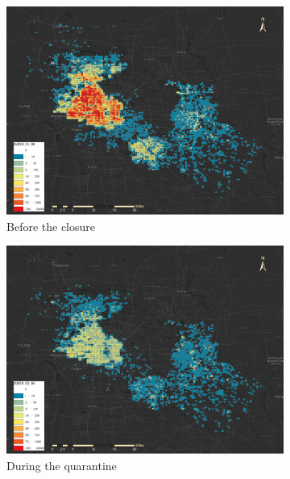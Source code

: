\documentclass[preprints,ijgi,submit,moreauthors]{Definitions/mdpi}
\begin{document}
\begin{figure}[H]
    \begin{subfigure}{.3\textwidth}
        \includegraphics[width=\textwidth]{Definitions/D2020_01_09.png}
        \caption{Before the closure}
    \end{subfigure}
    \begin{subfigure}{.3\textwidth}
        \includegraphics[width=\textwidth]{Definitions/D2020_02_05.png}
        \caption{During the quarantine}
    \end{subfigure}
    \begin{subfigure}{.3\textwidth}

\end{subfigure}
\end{figure}
\end{document}
